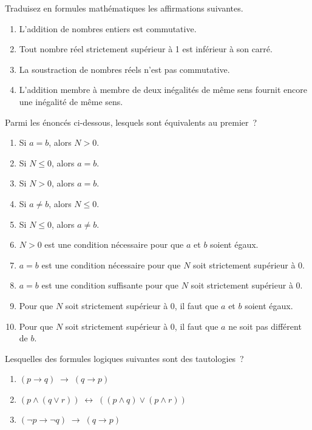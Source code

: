 \documentclass[12pt,french,oneside,a4paper]{memoir} %
\begin{document}
\begin{exo}
Traduisez en formules mathématiques les affirmations suivantes.

\begin{enumerate}
\item L'addition de nombres entiers est commutative.
\item Tout nombre réel strictement supérieur à 1 est inférieur à son
carré.  
\item La soustraction de nombres réels n'est pas commutative.
\item L'addition membre à membre de deux inégalités de même sens fournit
encore une inégalité de même sens.
\end{enumerate}
\end{exo}

\begin{exo}
Parmi les énoncés ci-dessous, lesquels sont équivalents au premier~?
\begin{enumerate}
\item Si $a=b$, alors $N>0$.
\item Si $N\leq 0$, alors $a=b$.
\item Si $N>0$, alors $a=b$.
\item Si $a\neq b$, alors $N\leq 0$.
\item Si $N\leq 0$, alors $a\neq b$.
\item $N>0$ est une condition nécessaire pour que $a$ et $b$ soient égaux.
\item $a=b$ est une condition nécessaire pour que $N$ soit strictement supérieur à 0.
\item $a=b$ est une condition suffisante pour que $N$ soit strictement supérieur à 0.
\item Pour que $N$ soit strictement supérieur à 0, il faut que $a$ et $b$ soient égaux.
\item Pour que $N$ soit strictement supérieur à 0, il faut que $a$ ne soit pas différent de $b$.
\end{enumerate}
\end{exo}

\begin{exo}
  Lesquelles des formules logiques suivantes sont des tautologies~?
  \begin{enumerate}
  \item $(p \to q) \;\to\; (q \to p)$
  \item $(p \land (q\lor r)) \;\leftrightarrow\; ((p\land q) \lor (p \land r))$
  \item $(\lnot p \to \lnot q) \;\to\; (q \to p)$
  \end{enumerate}
\end{exo}
\end{document}
